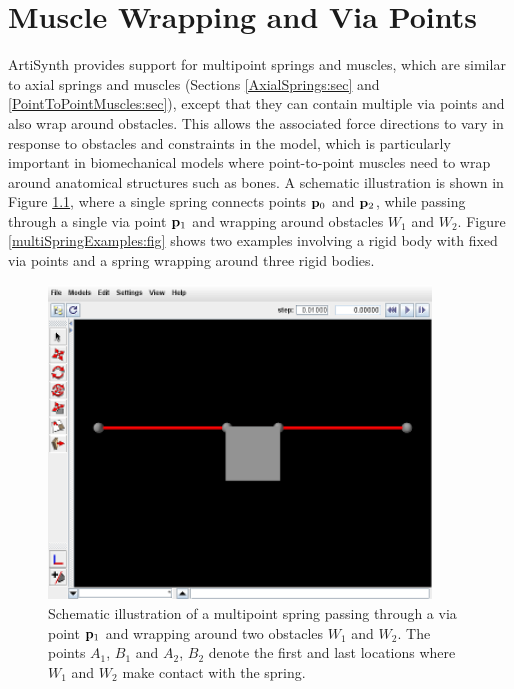 \ifdefined\maindoc\else
\def\doctitle{Muscle Wrapping and Via Points}

\mainmatter
\fi

\chapter{Muscle Wrapping and Via Points}
\label{multipointSpringIntro:sec}

ArtiSynth provides support for multipoint springs and muscles, which
are similar to axial springs and muscles (Sections
\ref{AxialSprings:sec} and \ref{PointToPointMuscles:sec}), except that
they can contain multiple via points and also wrap around obstacles.
This allows the associated force directions to vary in response to
obstacles and constraints in the model, which is particularly
important in biomechanical models where point-to-point muscles need to
wrap around anatomical structures such as bones.  A schematic
illustration is shown in Figure \ref{multiPointSpring:fig}, where a
single spring connects points ${\bf p}_0$ and ${\bf p}_2$, while passing through
a single via point ${\bf p}_1$ and wrapping around obstacles $W_1$ and
$W_2$. Figure \ref{multiSpringExamples:fig} shows two examples
involving a rigid body with fixed via points and a spring wrapping
around three rigid bodies.

\begin{figure}[ht]
\begin{center}
 \includegraphics[width=4in]{images/multiPointSpring}
\end{center}
\caption{Schematic illustration of a multipoint spring passing through
a via point ${\bf p}_1$ and wrapping around two obstacles $W_1$ and
$W_2$. The points $A_1$, $B_1$ and $A_2$, $B_2$ denote the first and
last locations where $W_1$ and $W_2$ make contact with the spring.}
\label{multiPointSpring:fig}
\end{figure}

